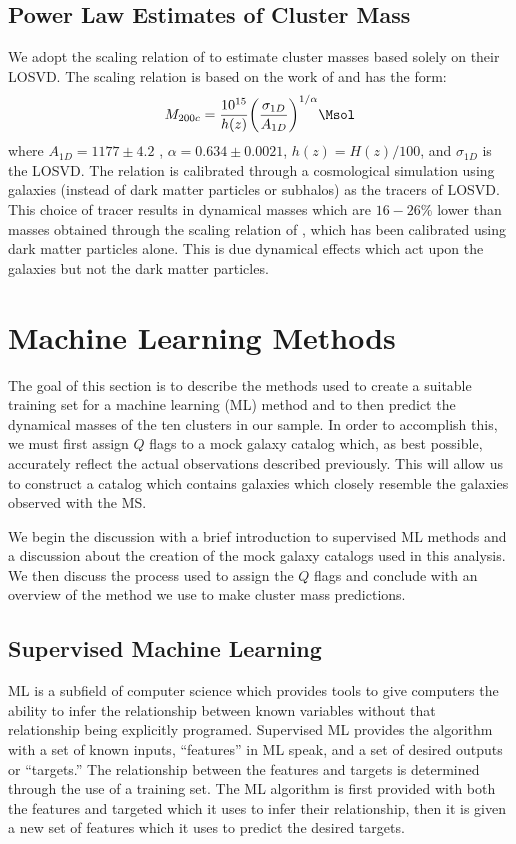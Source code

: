 \subsection{Power Law Estimates of Cluster Mass}
We adopt the scaling relation of \cite{Munari2013} to estimate cluster masses based solely on their LOSVD. The scaling relation is based on the work of \cite{Evrard2008} and has the form: 
\begin{equation}\label{eq:power law}
	M_{200c} = \frac{10^{15}}{h(z)} \bigg{(}\frac{\sigma_{1D}}{A_{1D}} \bigg{)}^{1/\alpha} \Msol 
\end{equation}
where $A_{1D} =1177\pm4.2$ \kms, $\alpha = 0.634\pm0.0021$, $h(z) = H(z)/100$, and $\sigma_{1D}$ is the LOSVD. The relation is calibrated through a cosmological simulation using galaxies (instead of dark matter particles or subhalos) as the tracers of LOSVD. This choice of tracer results in dynamical masses which are $16-26\%$ lower  than masses obtained through the scaling relation of \cite{Evrard2008}, which has been calibrated using dark matter particles alone. This is due dynamical effects which act upon the galaxies but not the dark matter particles.

\section{Machine Learning Methods}\label{sec:ML methods}
The goal of this section is to describe the methods used to create a suitable training set for a machine learning (ML) method and to then predict the dynamical masses of the ten clusters in our sample. In order to accomplish this, we must first assign $Q$ flags to a mock galaxy catalog which, as best possible, accurately reflect the actual observations described previously. This will allow us to construct a catalog which contains galaxies which closely resemble the galaxies observed with the MS.

We begin the discussion with a brief introduction to supervised ML methods and a discussion about the creation of the mock galaxy catalogs used in this analysis. We then discuss the process used to assign the $Q$ flags and conclude with an overview of the method we use to make cluster mass predictions.

\subsection{Supervised Machine Learning}
ML is a subfield of computer science which provides tools to give computers the ability to infer the relationship between known variables without that relationship being explicitly programed. Supervised ML provides the algorithm with a set of known inputs, ``features'' in ML speak, and a set of desired outputs or ``targets.'' The relationship between the features and targets is determined through the use of a training set. The ML algorithm is first provided with both the features and targeted which it uses to infer their relationship, then it is given a new set of features which it uses to predict the desired targets. 

